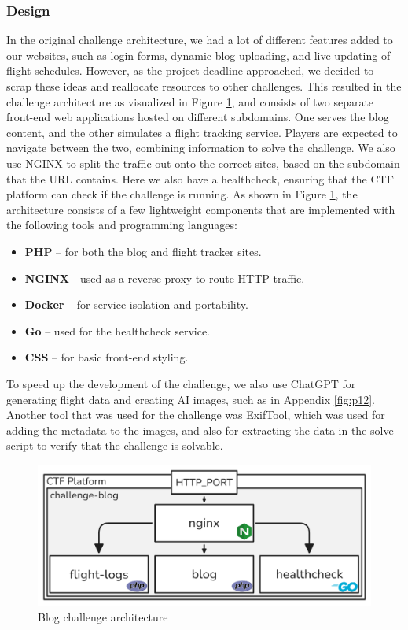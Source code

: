 \subsubsection{Design}
In the original challenge architecture, we had a lot of different features added to our websites, such as login forms, dynamic blog uploading, and live updating of flight schedules. However, as the project deadline approached, we decided to scrap these ideas and reallocate resources to other challenges. This resulted in the challenge architecture as visualized in Figure \ref{blog-architecture}, and consists of two separate front-end web applications hosted on different subdomains. One serves the blog content, and the other simulates a flight tracking service. Players are expected to navigate between the two, combining information to solve the challenge. We also use NGINX to split the traffic out onto the correct sites, based on the subdomain that the URL contains. Here we also have a healthcheck, ensuring that the CTF platform can check if the challenge is running. As shown in Figure \ref{blog-architecture}, the architecture consists of a few lightweight components that are implemented with the following tools and programming languages:
\begin{itemize} 
    \item \textbf{PHP} – for both the blog and flight tracker sites.
    \item \textbf{NGINX} - used as a reverse proxy to route HTTP traffic.
    \item \textbf{Docker} – for service isolation and portability.
    \item \textbf{Go} – used for the healthcheck service.
    \item \textbf{CSS} – for basic front-end styling.
\end{itemize}
\noindent
To speed up the development of the challenge, we also use ChatGPT for generating flight data and creating AI images, such as in Appendix \ref{fig:p12}. Another tool that was used for the challenge was ExifTool\cite{exiftool}, which was used for adding the metadata to the images, and also for extracting the data in the solve script to verify that the challenge is solvable.
\begin{figure}[H]
    \centering
    \includegraphics[width=0.8\linewidth]{img/challenge-blog--architecture.png}
    \caption{Blog challenge architecture}
    \label{blog-architecture}
\end{figure} 


